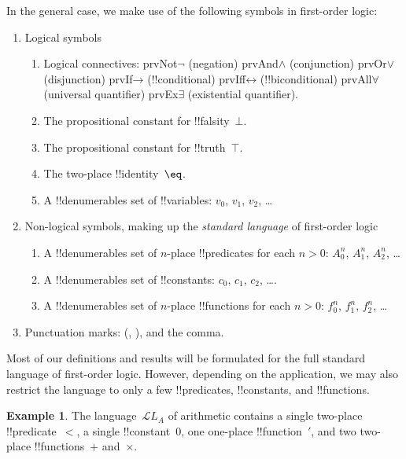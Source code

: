 \documentclass[10pt,a4paper]{article}
\theoremstyle{plain}
\theoremstyle{definition}
\newtheorem{ex}[thm]{Example}
\theoremstyle{remark}
\providecommand{\lif}{\mathbin{\rightarrow}}
\providecommand{\lforall}{\mathord{\forall}}
\providecommand{\lexists}{\mathord{\exists}}
\providecommand{\ltrue}{\top}
\providecommand{\lfalse}{\bot}
\providecommand{\Obj}{}
\providecommand{\Lang}{\ensuremath{\mathcal{L}}}
\providecommand{\iftag}[1]{#1}
\providecommand{\tagitem}[1]{\item[#1]}
\providecommand{\liff}{\mathbin{\leftrightarrow}}
\providecommand{\iftag}{}
\begin{document}
In the general case, we make use of the following symbols in
first-order logic:

\begin{enumerate}
\item Logical symbols
\begin{enumerate}
\item Logical connectives:
  \startycommalist
  \iftag{prvNot}{\ycomma $\lnot$ (negation)}{}%
  \iftag{prvAnd}{\ycomma $\land$ (conjunction)}{}%
  \iftag{prvOr}{\ycomma $\lor$ (disjunction)}{}%
  \iftag{prvIf}{\ycomma $\lif$ (!!{conditional})}{}%
  \iftag{prvIff}{\ycomma $\liff$ (!!{biconditional})}{}%
  \iftag{prvAll}{\ycomma $\lforall$ (universal quantifier)}{}%
  \iftag{prvEx}{\ycomma $\lexists$ (existential quantifier)}{}.
\tagitem{prvFalse}{The propositional constant for !!{falsity}~$\lfalse$.}{}
\tagitem{prvTrue}{The propositional constant for !!{truth}~$\ltrue$.}{}
\item The two-place !!{identity}~$\eq$.
\item A !!{denumerable}s set of !!{variable}s: $\Obj v_0$, $\Obj v_1$, $\Obj
  v_2$, \dots
\end{enumerate}
\item Non-logical symbols, making up the \emph{standard
  language} of first-order logic
\begin{enumerate}
\item A !!{denumerable}s set of $n$-place !!{predicate}s for each $n>0$: $\Obj
  A^n_0$, $\Obj A^n_1$, $\Obj A^n_2$, \dots
\item A !!{denumerable}s set of !!{constant}s: $\Obj c_0$, $\Obj c_1$, $\Obj
  c_2$, \dots.
\item A !!{denumerable}s set of $n$-place !!{function}s for each $n>0$:
  $\Obj f^n_0$, $\Obj f^n_1$, $\Obj f^n_2$, \dots
\end{enumerate}
\item Punctuation marks: (, ), and the comma.
\end{enumerate}

Most of our definitions and results will be formulated for the full
standard language of first-order logic.  However, depending on the
application, we may also restrict the language to only a few
!!{predicate}s, !!{constant}s, and !!{function}s.

\begin{ex}
The language~$\Lang L_A$ of arithmetic contains a single two-place
!!{predicate}~$<$, a single !!{constant}~$\Obj 0$, one one-place
!!{function}~$\prime$, and two two-place !!{function}s~$+$ and~$\times$.
\end{ex}
\end{document}
